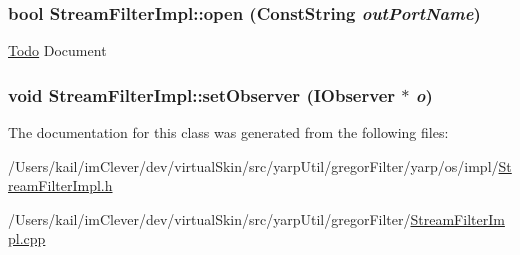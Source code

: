 \label{classyarp_1_1os_1_1impl_1_1_stream_filter_impl_a9ffe25ea43e69bcc50d3334fea26fff5}
\hypertarget{classyarp_1_1os_1_1impl_1_1_stream_filter_impl_a89e921dc1fa47bc6136bc3135e89ae03}{
\subsubsection[{open}]{\setlength{\rightskip}{0pt plus 5cm}bool StreamFilterImpl::open (ConstString {\em outPortName})}}
\label{classyarp_1_1os_1_1impl_1_1_stream_filter_impl_a89e921dc1fa47bc6136bc3135e89ae03}
\begin{Desc}
\item[\hyperlink{todo__todo000005}{Todo}]Document \end{Desc}
\hypertarget{classyarp_1_1os_1_1impl_1_1_stream_filter_impl_a269889b1cdc1992968861e49d7542e5d}{
\subsubsection[{setObserver}]{\setlength{\rightskip}{0pt plus 5cm}void StreamFilterImpl::setObserver ({\bf IObserver} $\ast$ {\em o})}}
\label{classyarp_1_1os_1_1impl_1_1_stream_filter_impl_a269889b1cdc1992968861e49d7542e5d}


The documentation for this class was generated from the following files:\begin{DoxyCompactItemize}
\item 
/Users/kail/imClever/dev/virtualSkin/src/yarpUtil/gregorFilter/yarp/os/impl/\hyperlink{_stream_filter_impl_8h}{StreamFilterImpl.h}\item 
/Users/kail/imClever/dev/virtualSkin/src/yarpUtil/gregorFilter/\hyperlink{_stream_filter_impl_8cpp}{StreamFilterImpl.cpp}\end{DoxyCompactItemize}
